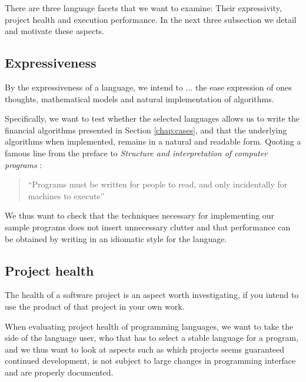 

There are three language facets that we want to examine: Their
expressivity, project health and execution performance. In the next
three subsection we detail and motivate these aspects.

\subsection{Expressiveness}
By the expressiveness of a language, we intend to ... the ease
expression of ones thoughts, mathematical models and natural
implementation of algorithms.


Specifically, we want to test whether the selected languages allows us
to write the financial algorithms presented in Section
\ref{chap:cases}, and that the underlying algorithms when implemented,
remains in a natural and readable form. Quoting a famous line from the
preface to \emph{Structure and interpretation of computer programs}
\cite{abelson1996structure}:
\begin{quote}
  ``Programs must be written for people to read, and only
  incidentally for machines to execute''
\end{quote}
We thus want to check that the techniques necessary for implementing
our sample programs does not insert unnecessary clutter and that
performance can be obtained by writing in an idiomatic style for the
language.


\subsection{Project health} 
The health of a software project is an aspect worth investigating, if
you intend to use the product of that project in your own work. 

When evaluating project health of programming languages, we want to
take the side of the language user, who that has to select a stable
language for a program, and we thus want to look at aspects such as
which projects seems guaranteed continued development, is not subject
to large changes in programming interface and are properly documented.

